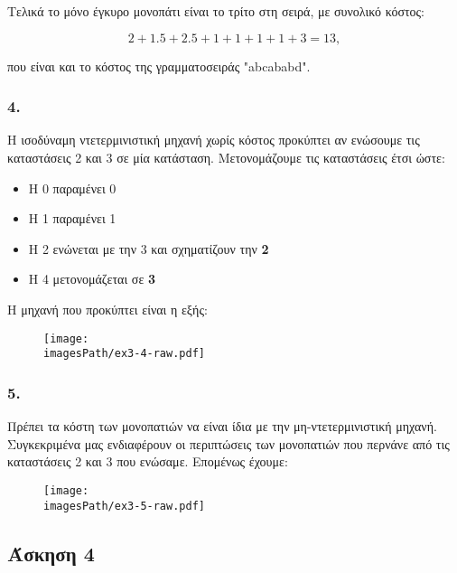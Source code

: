 \documentclass[12pt,a4paper]{article}
\newcommand{\imagesPath}{/home/nick/shmmy/8th/slp/slp-ntua/set1}
\begin{document}
			Τελικά το μόνο έγκυρο μονοπάτι είναι το τρίτο στη σειρά, με συνολικό κόστος:
			
			\[
				 2 + 1.5 + 2.5 + 1 + 1 + 1 + 1 + 3 = 13,
			\]
			
			που είναι και το κόστος της γραμματοσειράς "abcababd".
		
		\subsubsection*{4.} 
			Η ισοδύναμη ντετερμινιστική μηχανή χωρίς κόστος προκύπτει αν ενώσουμε τις καταστάσεις 2 και 3 σε μία κατάσταση. Μετονομάζουμε τις καταστάσεις έτσι ώστε:
			
			\begin{itemize}
				\item Η 0 παραμένει 0
				\item Η 1 παραμένει 1
				\item Η 2 ενώνεται με την 3 και σχηματίζουν την \textbf{2}
				\item Η 4 μετονομάζεται σε \textbf{3}
			\end{itemize}
			
			Η μηχανή που προκύπτει είναι η εξής:
			
			\begin{figure}[H]
				\begin{center}
					\texttt{[image: \\imagesPath/ex3-4-raw.pdf]}
				\end{center}
			\end{figure}
		
		\subsubsection*{5.} 
			Πρέπει τα κόστη των μονοπατιών να είναι ίδια με την μη-ντετερμινιστική μηχανή. Συγκεκριμένα μας ενδιαφέρουν οι περιπτώσεις των μονοπατιών που περνάνε από τις καταστάσεις 2 και 3 που ενώσαμε. Επομένως έχουμε:
			
			\begin{figure}[H]
				\begin{center}
					\texttt{[image: \\imagesPath/ex3-5-raw.pdf]}
				\end{center}
			\end{figure}
			

	\subsection*{Άσκηση 4}
	
\end{document}
